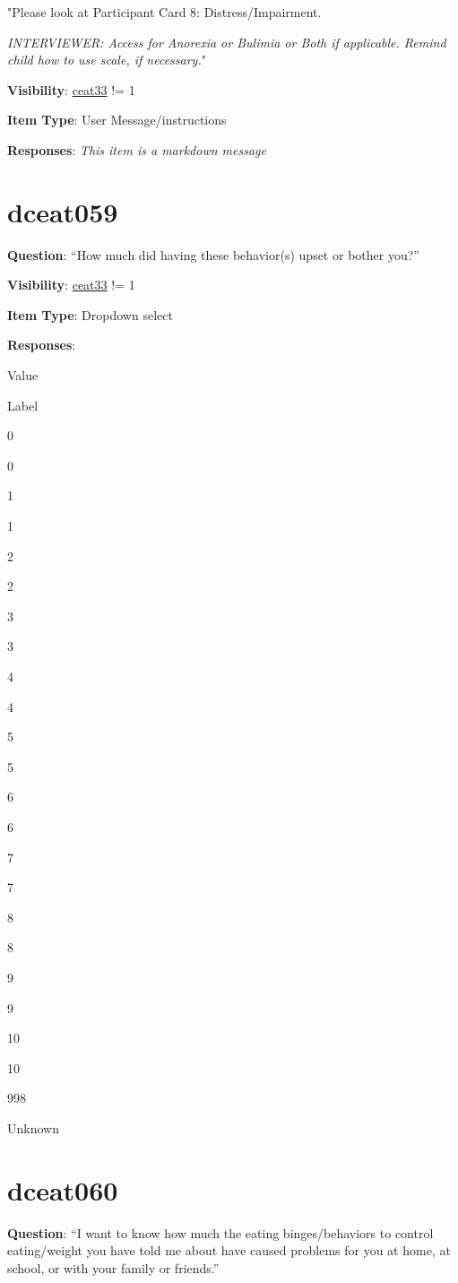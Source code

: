 \documentclass[]{book}
\begin{document}
"Please look at Participant Card 8: Distress/Impairment.

\emph{INTERVIEWER: Access for Anorexia or Bulimia or Both if applicable. Remind child how to use scale, if necessary.}"

\textbf{Visibility}: \protect\hyperlink{ceat33}{ceat33} != 1

\textbf{Item Type}: User Message/instructions

\textbf{Responses}: \emph{This item is a markdown message}

\hypertarget{dceat059}{%
\section{dceat059}\label{dceat059}}

\textbf{Question}: ``How much did having these behavior(s) upset or bother you?''

\textbf{Visibility}: \protect\hyperlink{ceat33}{ceat33} != 1

\textbf{Item Type}: Dropdown select

\textbf{Responses}:

Value

Label

0

0

1

1

2

2

3

3

4

4

5

5

6

6

7

7

8

8

9

9

10

10

998

Unknown

\hypertarget{dceat060}{%
\section{dceat060}\label{dceat060}}

\textbf{Question}: ``I want to know how much the eating binges/behaviors to control eating/weight you have told me about have caused problems for you at home, at school, or with your family or friends.''
\end{document}
